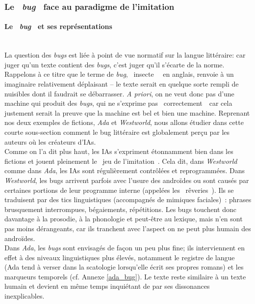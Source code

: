 \documentclass{article}
\newcommand{\subsubsubsection}[1]{\paragraph{#1}\mbox{}\\}
\begin{document}
			\subsubsection{Le \textit{\guillemotleft~bug~\guillemotright} face au paradigme de l'imitation}\label{test_turing}
				\subsubsubsection{Le \textit{\guillemotleft~bug~\guillemotright} et ses représentations}
					La question des \textit{bugs} est liée à point de vue normatif sur la langue littéraire: car juger qu'un texte contient des \textit{bugs}, c'est juger qu'il s'écarte de la norme. Rappelons à ce titre que le terme de \textit{bug}, \guillemotleft~insecte~\guillemotright~ en anglais, renvoie à un imaginaire relativement déplaisant -- le texte serait en quelque sorte rempli de nuisibles dont il faudrait se débarrasser. \textit{A priori}, on ne veut donc pas d'une machine qui produit des \textit{bugs}, qui ne s'exprime pas \guillemotleft~correctement~\guillemotright~car cela justement serait la preuve que la machine est bel et bien une machine. Reprenant nos deux exemples de fictions, \textit{Ada} et \textit{Westworld}, nous allons étudier dans cette courte sous-section comment le bug littéraire est globalement perçu par les auteurs où les créateurs d'IAs.\\
					
					Comme on l'a dit plus haut, les IAs s'expriment étonnamment bien dans les fictions et jouent pleinement le \guillemotleft~jeu de l'imitation~\guillemotright. Cela dit, dans \textit{Westworld} comme dans \textit{Ada}, les IAs sont régulièrement contrôlées et reprogrammées. Dans \textit{Westworld}, les bugs arrivent parfois avec l'usure des androïdes ou sont causés par certaines portions de leur programme interne (appelées les \guillemotleft~rêveries~\guillemotright). Ils se traduisent par des tics linguistiques (accompagnés de mimiques faciales)~: phrases brusquement interrompues, bégaiements, répétitions. Les bugs touchent donc davantage à la prosodie, à la phonologie et peut-être au lexique, mais n'en sont pas moins dérangeants, car ils tranchent avec l'aspect on ne peut plus humain des androïdes.\\
					
					Dans \textit{Ada}, les \textit{bugs} sont envisagés de façon un peu plus fine; ils interviennent en effet à des niveaux linguistiques plus élevés, notamment le registre de langue (Ada tend à verser dans la scatologie lorsqu'elle écrit ses propres romans) et les marqueurs temporels (cf. Annexe \ref{ada_bug}). Le texte reste similaire à un texte humain et devient en même temps inquiétant de par ses dissonances inexplicables.\\
					
\end{document}
